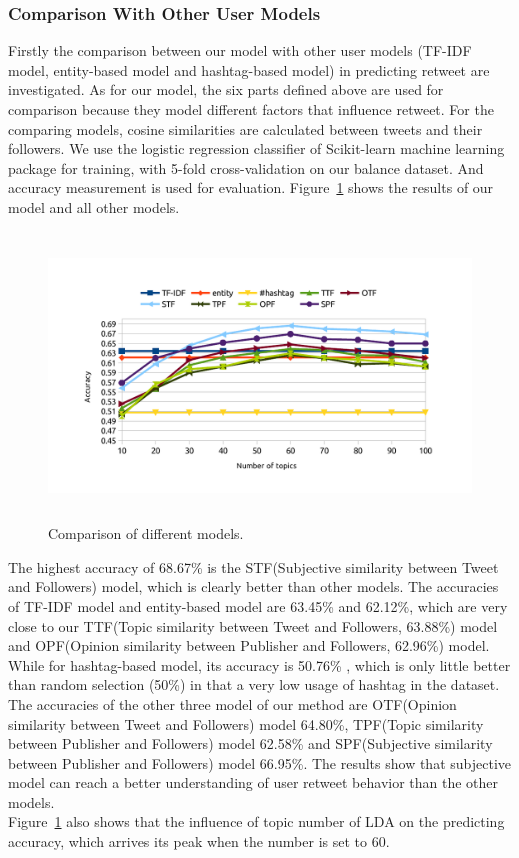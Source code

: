\documentclass[preprint,times]{elsarticle}
\begin{document}
\subsubsection{Comparison With Other User Models}
\label{comparison}
Firstly the comparison between our model with other user models (TF-IDF model\cite{Luo:2013RMF}, entity-based model and hashtag-based model\cite{Abel:2011AUM}) in predicting retweet are investigated.
As for our model, the six parts defined above are used for comparison because they model different factors that influence retweet.
For the comparing models, cosine similarities are calculated between tweets and their followers.
We use the logistic regression classifier of Scikit-learn machine learning package\cite{scikit-learn} for training, with 5-fold cross-validation on our balance dataset.
And accuracy measurement is used for evaluation.
Figure~\ref{fig:graph7} shows the results of our model and all other models.
\begin{figure}[htb]
\centering
\includegraphics[width=4.5in,height=3.0in]{comparison.pdf}
\caption{Comparison of different models.}
\label{fig:graph7}
\end{figure}
The highest accuracy of 68.67\% is the STF(Subjective similarity between Tweet and Followers) model, which is clearly better than other models. 
The accuracies of TF-IDF model and entity-based model are 63.45\% and 62.12\%, which are very close to our TTF(Topic similarity between Tweet and Followers, 63.88\%) model and OPF(Opinion similarity between Publisher and Followers, 62.96\%) model.
While for hashtag-based model, its accuracy is  50.76\% , which is only little better than random selection (50\%) in that a very low usage of hashtag in the dataset.
The accuracies of the other three model of our method are OTF(Opinion similarity between Tweet and Followers) model 64.80\%, TPF(Topic similarity between Publisher and Followers) model 62.58\% and SPF(Subjective similarity between Publisher and Followers) model 66.95\%.
The results show that subjective model can reach a better understanding of user retweet behavior than the other models.\\
Figure~\ref{fig:graph7} also shows that the influence of topic number of LDA on the predicting accuracy, which arrives its peak when the number is set to 60.
\end{document}
